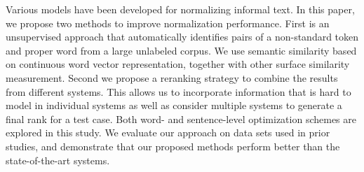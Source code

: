 Various models have been developed for normalizing informal text. In this paper, we propose two methods to improve normalization performance. First is an unsupervised approach that automatically identifies pairs of a non-standard token and proper word from a large unlabeled corpus. We use semantic similarity based on continuous word vector representation, together with other surface similarity measurement. Second we propose a reranking strategy to combine the results from different systems. This allows us to incorporate information that is hard to model in individual systems as well as consider multiple systems to generate a final rank for a test case. Both word- and sentence-level optimization schemes are explored in this study. We evaluate our approach on data sets used in prior studies, and demonstrate that our proposed methods perform better than the state-of-the-art systems.
